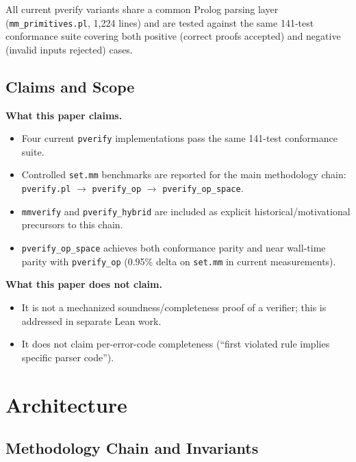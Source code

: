 \documentclass[11pt]{article}
\begin{document}
All current pverify variants share a common Prolog parsing layer
(\texttt{mm\_primitives.pl}, 1{,}224 lines) and are tested against
the same 141-test conformance suite covering both positive
(correct proofs accepted) and negative (invalid inputs rejected)
cases.

\subsection{Claims and Scope}
\label{sec:claims}

\textbf{What this paper claims.}
\begin{itemize}[leftmargin=2em]
  \item Four current \texttt{pverify} implementations pass the same
    141-test conformance suite.
  \item Controlled \texttt{set.mm} benchmarks are reported for the
    main methodology chain:
    \texttt{pverify.pl} $\rightarrow$
    \texttt{pverify\_op} $\rightarrow$
    \texttt{pverify\_op\_space}.
  \item \texttt{mmverify} and \texttt{pverify\_hybrid} are included
    as explicit historical/motivational precursors to this chain.
  \item \texttt{pverify\_op\_space} achieves both conformance parity
    and near wall-time parity with \texttt{pverify\_op}
    (0.95\% delta on \texttt{set.mm} in current measurements).
\end{itemize}

\textbf{What this paper does not claim.}
\begin{itemize}[leftmargin=2em]
  \item It is not a mechanized soundness/completeness proof of a
    verifier; this is addressed in separate Lean work.
  \item It does not claim per-error-code completeness (``first
    violated rule implies specific parser code'').
\end{itemize}

\section{Architecture}
\label{sec:arch}

\subsection{Methodology Chain and Invariants}
\label{sec:method-chain}
\end{document}
